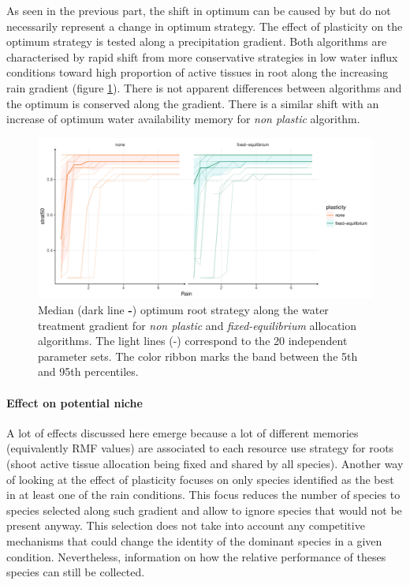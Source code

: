 As seen in the previous part, the shift in optimum can be caused by  but do not necessarily represent a change in optimum strategy. The effect of plasticity on the optimum strategy is tested along a precipitation gradient. Both algorithms are characterised by rapid shift from more conservative strategies in low water influx conditions toward high proportion of active tissues in root along the increasing rain gradient (figure \ref{fig:gradient_optimum_strat}).  There is not apparent differences between algorithms and the optimum is conserved along the gradient. There is a similar shift with an increase of optimum water availability memory for \textit{non plastic} algorithm.


\begin{figure}\label{fig:gradient_optimum_strat}
\includegraphics[width = \textwidth]{./2_PP/Figures/Rain/best_strat_pl_rain_grad_alt.pdf}
\caption{Median (dark line \textbf{-}) optimum root strategy along the water treatment gradient for \textit{non plastic} and \textit{fixed-equilibrium} allocation algorithms. The light lines (-) correspond to the 20 independent parameter sets. The color ribbon marks the band between the 5th and 95th percentiles.} %
\end{figure}

\paragraph{Effect on potential niche}

A lot of effects discussed here emerge because a lot of different memories (equivalently RMF values) are associated to each resource use strategy for roots (shoot active tissue allocation being fixed and shared by all species). Another way of looking at the effect of plasticity focuses on only species identified as the best in at least one of the rain conditions. This focus reduces the number of species to species selected along such gradient and allow to ignore species that would not be present anyway. This selection does not take into account any competitive mechanisms that could change the identity of the dominant species in a given condition. Nevertheless, information on how the relative performance of theses species can still be collected.



